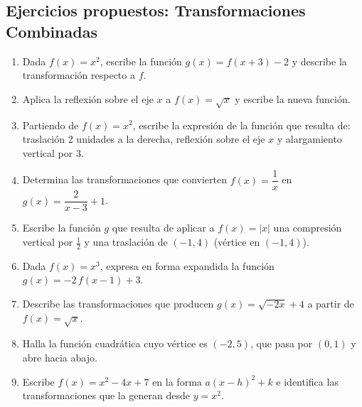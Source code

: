 \documentclass[12pt, letterpaper]{article}
\begin{document}

\subsection{Ejercicios propuestos: Transformaciones Combinadas}

\begin{enumerate}[resume=ejercicios, leftmargin=*]
  \item \facil{} Dada $f(x) = x^2$, escribe la función $g(x) = f(x + 3) - 2$ y describe la transformación respecto a $f$.

  \item \facil{} Aplica la reflexión sobre el eje $x$ a $f(x) = \sqrt{x}$ y escribe la nueva función.

  \item \medio{} Partiendo de $f(x) = x^2$, escribe la expresión de la función que resulta de: traslación 2 unidades a la derecha, reflexión sobre el eje $x$ y alargamiento vertical por 3.

  \item \medio{} Determina las transformaciones que convierten $f(x) = \dfrac{1}{x}$ en $g(x) = \dfrac{2}{x - 3} + 1$.

  \item \medio{} Escribe la función $g$ que resulta de aplicar a $f(x) = |x|$ una compresión vertical por $\frac{1}{2}$ y una traslación de $(-1, 4)$ (vértice en $(-1, 4)$).

  \item \dificil{} Dada $f(x) = x^3$, expresa en forma expandida la función $g(x) = -2\,f(x - 1) + 3$.

  \item \dificil{} Describe las transformaciones que producen $g(x) = \sqrt{-2x} + 4$ a partir de $f(x) = \sqrt{x}$.

  \item \dificil{} Halla la función cuadrática cuyo vértice es $(-2, 5)$, que pasa por $(0, 1)$ y abre hacia abajo.

  \item \muyDificil{} Escribe $f(x) = x^2 - 4x + 7$ en la forma $a(x - h)^2 + k$ e identifica las transformaciones que la generan desde $y = x^2$.
\end{enumerate}
\end{document}
